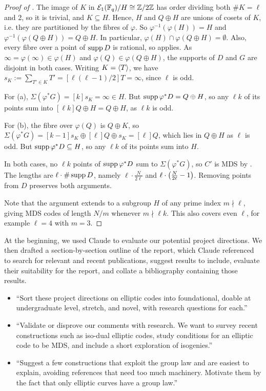 \documentclass[twocolumn, 11pt]{scrartcl}
\begin{document}
\begin{proof}[Proof of ]\label{proof:index-two-pullback}
    The image of $K$ in $\mcE_1(\bbF_q)/H\cong\bbZ/2\bbZ$ has order dividing both $\#K=\ell$ and 2, so it is trivial, and $K\subseteq H$. Hence, $H$ and $Q\oplus H$ are unions of cosets of $K$, i.e. they are partitioned by the fibres of $\varphi$. So $\varphi^{-1}(\varphi(H))=H$ and $\varphi^{-1}(\varphi(Q\oplus H))=Q\oplus H$. In particular, $\varphi(H)\cap\varphi(Q\oplus H)=\emptyset$. Also, every fibre over a point of $\supp D$ is rational, so  applies. As $\infty=\varphi(\infty)\in\varphi(H)$ and $\varphi(Q)\in\varphi(Q\oplus H)$, the supports of $D$ and $G$ are disjoint in both cases. Writing $K=\ang T$, we have $s_K:=\sum_{T'\in K}T'=[\ell(\ell-1)/2]T=\infty$, since $\ell$ is odd.

    For (a), $\Sigma(\varphi^*G)=[k]s_K=\infty\in H$. But $\supp\varphi^*D=Q\oplus H$, so any $\ell k$ of its points sum into $[\ell k]Q\oplus H=Q\oplus H$, as $\ell k$ is odd.

    For (b), the fibre over $\varphi(Q)$ is $Q\oplus K$, so $\Sigma(\varphi^*G)=[k-1]s_K\oplus[\ell]Q\oplus s_K=[\ell]Q$, which lies in $Q\oplus H$ as $\ell$ is odd. But $\supp\varphi^*D\subseteq H$, so any $\ell k$ of its points sum into $H$.

    In both cases, no $\ell k$ points of $\supp\varphi^*D$ sum to $\Sigma(\varphi^*G)$, so $C'$ is MDS by . The lengths are $\ell\cdot\#\supp D$, namely $\ell\cdot\frac N{2\ell}$ and $\ell\cdot\pa[\big]{\frac N{2\ell}-1}$. Removing points from $D$ preserves both arguments.
    
    Note that the argument extends to a subgroup $H$ of any prime index $m\nmid\ell$, giving MDS codes of length $N/m$ whenever $m\nmid\ell k$. This also covers even $\ell$, for example $\ell=4$ with $m=3$.
\end{proof}


At the beginning, we used Claude to evaluate our potential project directions. We then drafted a section-by-section outline of the report, which Claude referenced to search for relevant and recent publications, suggest results to include, evaluate their suitability for the report, and collate a bibliography containing those results.
\begin{itemize}
    \item ``Sort these project directions on elliptic codes into foundational, doable at undergraduate level, stretch, and novel, with research questions for each.''
    \item ``Validate or disprove our comments with research. We want to survey recent constructions such as iso-dual elliptic codes, study conditions for an elliptic code to be MDS, and include a short exploration of isogenies.''
    \item ``Suggest a few constructions that exploit the group law and are easiest to explain, avoiding references that need too much machinery. Motivate them by the fact that only elliptic curves have a group law.''
\end{itemize}
\end{document}
